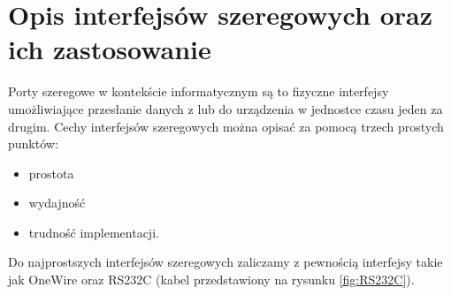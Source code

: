 \documentclass{BscUS}
\begin{document}
\section{Opis interfejsów szeregowych oraz ich zastosowanie}
\label{s:serialInterface}
\indent Porty szeregowe w kontekście informatycznym są to fizyczne interfejsy umożliwiające przesłanie danych z lub do urządzenia w jednostce czasu jeden za drugim. Cechy interfejsów szeregowych można opisać za pomocą trzech prostych punktów:
\begin{itemize}
\item prostota
\item wydajność
\item trudność implementacji.
\end{itemize}
Do najprostszych interfejsów szeregowych zaliczamy z pewnością interfejsy takie jak OneWire oraz RS232C (kabel przedstawiony na rysunku \ref{fig:RS232C}).
\end{document}
